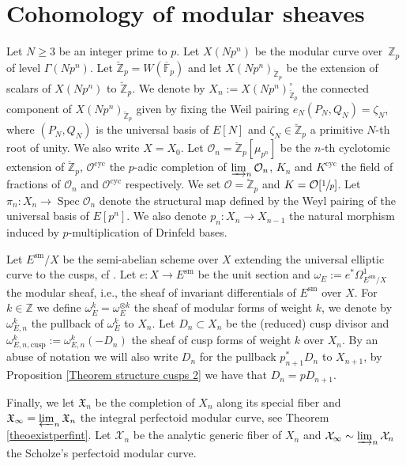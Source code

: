 \documentclass[11pt]{article}
\newcommand{\ie}{i.e.,\xspace}
\newcommand{\cusp}{\mathrm{cusp}}
\newcommand{\cyc}{\mathrm{cyc}}
\newcommand{\sm}{\mathrm{sm}}
\numberwithin{equation}{section}
\theoremstyle{definition}
\newcommand{\bb}[1]{\mathbb{#1}}
\newcommand{\n}[1]{\mathcal{#1}}
\newcommand{\f}[1]{\mathfrak{#1}}
\DeclareMathOperator{\Spec}{Spec}
\begin{document}
\section{Cohomology of modular sheaves}
\label{COhomology of modular sheaves}

Let $N\geq 3$ be an integer prime to $p$. Let $X(Np^n)$ be the modular curve over~$\bb{Z}_p$ of level $\Gamma(Np^n)$. Let $\breve{\bb{Z}}_p=W(\overline{\bb{F}}_p)$ and let $X(Np^n)_{\breve{\bb{Z}}_p}$ be the extension of scalars of $X(Np^n)$ to $\breve{\bb{Z}}_p$. We denote by $X_n:=X(Np^n)^{\circ}_{\breve{\bb{Z}}_p}$ the connected component of $X(Np^n)_{\breve{\bb{Z}}_p}$ given by fixing the Weil pairing $e_{N}(P_N,Q_N)=\zeta_{N}$, where $(P_N,Q_N)$ is the universal basis of $E[N]$ and $\zeta_N\in \breve{\bb{Z}}_p$ a primitive $N$-th root of unity. We also write $X=X_0$. Let $\n{O}_n= \breve{\bb{Z}}_p[\mu_{p^n}]$ be the $n$-th cyclotomic extension of $\breve{\bb{Z}}_p$, $\n{O}^{\cyc}$ the $p$-adic completion of $\varinjlim_{n} \n{O}_n$, $K_n$ and $K^{\cyc}$ the field of fractions of $\n{O}_n$ and $\n{O}^{\cyc}$ respectively. We set $\n{O}=\breve{\bb{Z}}_p$ and $K=\n{O}[\sfrac{1}{p}]$. Let $\pi_n : X_n\to \Spec \n{O}_n$ denote the structural map defined by the Weyl pairing of the universal basis of $E[p^n]$. We also denote $p_n: X_n\to X_{n-1}$ the natural morphism induced by $p$-multiplication of Drinfeld bases.

Let $E^{\sm}/X$ be the semi-abelian scheme over $X$ extending the universal elliptic curve to the cusps, cf \cite{deligne1973schemas}. Let $e:X\to E^{\sm}$ be the unit section and $\omega_E:=e^* \Omega^1_{E^{\sm}/X}$ the modular sheaf, \ie the sheaf of invariant differentials of $E^{\sm}$ over $X$. For $k\in \bb{Z}$ we define $\omega_E^{k}= \omega_E^{\otimes k}$ the sheaf of modular forms of weight $k$, we denote by $\omega^k_{E,n}$ the pullback of $\omega_E^k$ to $X_n$. Let $D_n\subset X_n$ be the (reduced) cusp divisor and $\omega_{E,n,\cusp}^k:=\omega_{E,n}^k(-D_n)$ the sheaf of cusp forms of weight $k$ over $X_n$. By an abuse of notation we will also write $D_n$ for the pullback $p_{n+1}^* D_n$ to $X_{n+1}$, by Proposition \ref{Theorem structure cusps 2} we have that $D_{n}=p D_{n+1}$.

Finally, we let $\f{X}_n$ be the completion of $X_n$ along its special fiber and $\f{X}_{\infty}=\varprojlim_{n} \f{X}_n$ the integral perfectoid modular curve, see Theorem \ref{theoexistperfint}. Let $\n{X}_n$ be the analytic generic fiber of $X_n$ and $\n{X}_{\infty}\sim \varinjlim_n \n{X}_n$ the Scholze's perfectoid modular curve.
\end{document}
